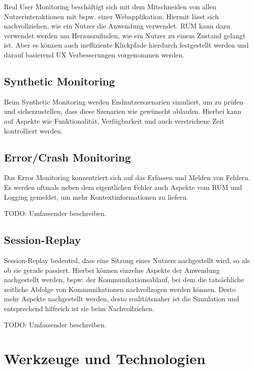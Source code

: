 Real User Monitoring beschäftigt sich mit dem Mitschneiden von allen Nutzerinteraktionen mit bspw. einer Webapplikation. Hiermit lässt sich nachvollziehen, wie ein Nutzer die Anwendung verwendet. RUM kann dazu verwendet werden um Herauszufinden, wie ein Nutzer zu einem Zustand gelangt ist. Aber es können auch ineffiziente Klickpfade hierdurch festgestellt werden und darauf basierend UX Verbesserungen vorgenommen werden.

\subsection{Synthetic Monitoring}

Beim Synthetic Monitoring werden Endnutzerszenarien simuliert, um zu prüfen und sicherzustellen, dass diese Szenarien wie gewünscht ablaufen. Hierbei kann auf Aspekte wie Funktionalität, Verfügbarkeit und auch verstrichene Zeit kontrolliert werden.

\subsection{Error/Crash Monitoring}

Das Error Monitoring konzentriert sich auf das Erfassen und Melden von Fehlern. Es werden oftmals neben dem eigentlichen Fehler auch Aspekte vom RUM und Logging gemeldet, um mehr Kontextinformationen zu liefern.

{\color{red}TODO: Umfassender beschreiben.}

\subsection{Session-Replay}

Session-Replay bedeuted, dass eine Sitzung eines Nutzers nachgestellt wird, so als ob sie gerade passiert. Hierbei können einzelne Aspekte der Anwendung nachgestellt werden, bspw. der Kommunikationsablauf, bei dem die tatsächliche zeitliche Abfolge von Kommunikationen nachvollzogen werden können. Desto mehr Aspekte nachgestellt werden, desto realitätsnaher ist die Simulation und entsprechend hilfreich ist sie beim Nachvollziehen.

{\color{red}TODO: Umfassender beschreiben.}

\newpage

\section{Werkzeuge und Technologien}
\label{sec:werkzeuge-und-technologien}

